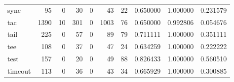 \begin{tabular}{lrrrrrrrrr}
sync      &                                                 95 &                                                  0 &                                                 30 &                                                  0 &                                                 43 &                                                 22 &                                           0.650000 &                               1.000000 &                             0.231579 \\
tac       &                                               1390 &                                                 10 &                                                301 &                                                  0 &                                               1003 &                                                 76 &                                           0.650000 &                               0.992806 &                             0.054676 \\
tail      &                                                225 &                                                  0 &                                                 57 &                                                  0 &                                                 89 &                                                 79 &                                           0.711111 &                               1.000000 &                             0.351111 \\
tee       &                                                108 &                                                  0 &                                                 37 &                                                  0 &                                                 47 &                                                 24 &                                           0.634259 &                               1.000000 &                             0.222222 \\
test      &                                                157 &                                                  0 &                                                 20 &                                                  0 &                                                 49 &                                                 88 &                                           0.826433 &                               1.000000 &                             0.560510 \\
timeout   &                                                113 &                                                  0 &                                                 36 &                                                  0 &                                                 43 &                                                 34 &                                           0.665929 &                               1.000000 &                             0.300885 \\

\end{tabular}
